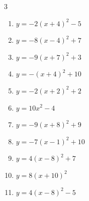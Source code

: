 \begin{multicols}{3}
\begin{enumerate}
        \phantom{$\displaystyle 頂点\left( 0 , 4 \right)$}

  \item $\displaystyle y=-2\left( x+4\right)^{2}-5$

        \phantom{$\displaystyle 頂点\left( -4 , -5 \right)$}

  \item $\displaystyle y=-8\left( x-4\right)^{2}+7$

        \phantom{$\displaystyle 頂点\left( 4 , 7 \right)$}

  \item $\displaystyle y=-9\left( x+7\right)^{2}+3$

        \phantom{$\displaystyle 頂点\left( -7 , 3 \right)$}

  \item $\displaystyle y=-\left( x+4\right)^{2}+10$

        \phantom{$\displaystyle 頂点\left( -4 , 10 \right)$}

  \item $\displaystyle y=-2\left( x+2\right)^{2}+2$

        \phantom{$\displaystyle 頂点\left( -2 , 2 \right)$}

  \item $\displaystyle y=10x^{2}-4$

        \phantom{$\displaystyle 頂点\left( 0 , -4 \right)$}

  \item $\displaystyle y=-9\left( x+8\right)^{2}+9$

        \phantom{$\displaystyle 頂点\left( -8 , 9 \right)$}

  \item $\displaystyle y=-7\left( x-1\right)^{2}+10$

        \phantom{$\displaystyle 頂点\left( 1 , 10 \right)$}

  \item $\displaystyle y=4\left( x-8\right)^{2}+7$

        \phantom{$\displaystyle 頂点\left( 8 , 7 \right)$}

  \item $\displaystyle y=8\left( x+10\right)^{2}$

        \phantom{$\displaystyle 頂点\left( -10 , 0 \right)$}

  \item $\displaystyle y=4\left( x-8\right)^{2}-5$

        \phantom{$\displaystyle 頂点\left( 8 , -5 \right)$}


\end{enumerate}
\end{multicols}
